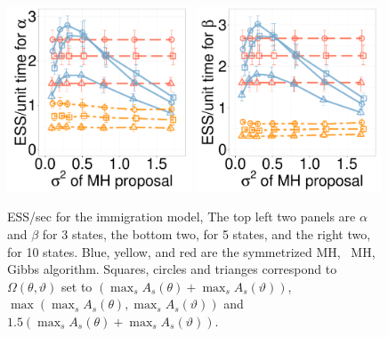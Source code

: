 \begin{figure}[H]
  \begin{minipage}[h!]{0.49\linewidth}
  \centering
    \includegraphics [width=0.49\textwidth, angle=0]{figs/new_whole_exp_figs/q_alpha_dim5.pdf}
    \includegraphics [width=0.49\textwidth, angle=0]{figs/new_whole_exp_figs/q_beta_dim5.pdf}
  \end{minipage}
  \begin{minipage}[!hp]{0.49\linewidth}
    \caption{ESS/sec for the immigration model, The top left two panels are $\alpha$ and $\beta$ for 3 states, the bottom two, for 5 states, and the right two, for 10 states. Blue, yellow, and red are the symmetrized MH, \naive\ MH, Gibbs algorithm. Squares, circles and trianges correspond to $\Omega(\theta,\vartheta)$ set to $(\max_s A_s(\theta) + \max_s A_s(\vartheta))$, $\max(\max_s A_s(\theta), \max_s A_s(\vartheta))$ and  $1.5(\max_s A_s(\theta) + \max_s A_s(\vartheta))$.}
     \label{fig:ESS_Q}
  \end{minipage}
  \end{figure}


